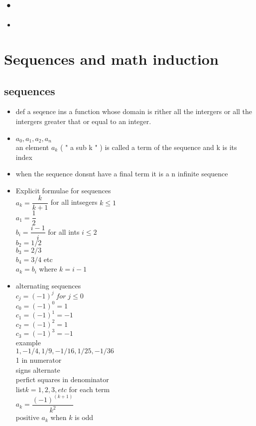 \documentclass[10pt,letterpaper]{report}
\begin{document}
\section{•}
\begin{itemize}
\item 
\end{itemize}
\chapter{Sequences and math induction}
\section{sequences}
\begin{itemize}
\item def a seqence ins a function whose domain is rither all the intergers or all the intergers greater that or equal to an integer.
\item $a_0,a_1,a_2,a_n $ \\ an element $a_k $ ( " a sub k " ) is called a term of the sequence and k is its index 
\item when the sequence donsnt have a final term it is a n infinite sequence 
\item Explicit formulae for sequences \\ $ a_k = \dfrac{k}{k+1}$ for all intsegers $ k \leq 1 $ \\ $ a_ 1 = \dfrac{1}{2} $ \\ $ b_i = \dfrac{i-1}{i}  $ for all ints $ i \leq 2 $ \\ $b_2 = 1/2 $ \\ $ b_3 = 2/3 $ \\ $ b_ 4 = 3/4$ etc \\ $ a_k = b_i $ where $ k = i - 1 $ 
\item alternating sequences \\ $ c_j = (-1)^j \;	for \; j \leq 0 $ \\ $ c_0 = (-1)^0 = 1 $ \\ $ c_1 = (-1)^1 = -1  $ \\ $ c_2 = (-1)^2 = 1 $ \\ $ c_3 = (-1)^3 = -1 $ \\ example \\ $ 1, -1/4, 1/9 , -1/16, 1/25, -1/36$ \\ 1 in numerator \\ signs alternate \\ perfict squares in denominator \\ list$ k = 1,2,3,etc$ for each term \\$ a_k = \dfrac{(-1)^(k+1) }{k^2} $ \\ positive $a_k $ when $k$ is odd  

\end{itemize}
\end{document}
